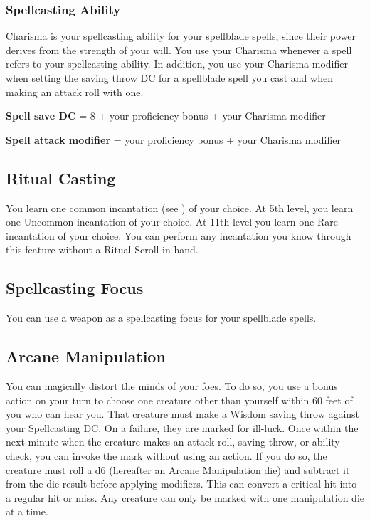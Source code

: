\subsubsection{Spellcasting Ability}

Charisma is your spellcasting ability for your spellblade spells, since their power derives from the strength of your will. You use your Charisma whenever a spell refers to your spellcasting ability. In addition, you use your Charisma modifier when setting the saving throw DC for a spellblade spell you cast and when making an attack roll with one.

\textbf{Spell save DC} = 8 + your proficiency bonus + your Charisma modifier

\textbf{Spell attack modifier} = your proficiency bonus + your Charisma modifier

\subsection{Ritual Casting}

You learn one common incantation (see ) of your choice. At 5th level, you learn one Uncommon incantation of your choice. At 11th level you learn one Rare incantation of your choice. You can perform any incantation you know through this feature without a Ritual Scroll in hand.

\subsection{Spellcasting Focus}

You can use a weapon as a spellcasting focus for your spellblade spells.

\subsection{Arcane Manipulation}

You can magically distort the minds of your foes. To do so, you use a bonus action on your turn to choose one creature other than yourself within 60 feet of you who can hear you. That creature must make a Wisdom saving throw against your Spellcasting DC. On a failure, they are marked for ill-luck. Once within the next minute when the creature makes an attack roll, saving throw, or ability check, you can invoke the mark without using an action. If you do so, the creature must roll a d6 (hereafter an Arcane Manipulation die) and subtract it from the die result before applying modifiers. This can convert a critical hit into a regular hit or miss. Any creature can only be marked with one manipulation die at a time.

